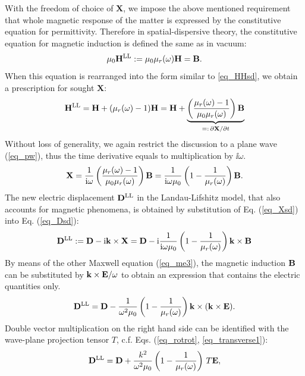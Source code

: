 With the freedom of choice of $\mathbf{X}$, we impose the above mentioned requirement that whole magnetic response of the matter is expressed by the constitutive equation for permittivity. Therefore in spatial-dispersive theory, the constitutive equation %
for magnetic induction is defined the same as in vacuum:
\begin{equation} \mu_0 {\mathbf{H}^\text{LL}} := \mu_0 \mu_r(\omega) \mathbf{H} = \mathbf{B}. \label{eq_mu_sd}\end{equation}
When this equation is rearranged into the form similar to \ref{eq_HHsd}, we obtain a prescription for sought $\mathbf{X}$: 
$$ {\mathbf{H}^\text{LL}} = \mathbf{H} + (\mu_r(\omega) -1)\mathbf{H} = \mathbf{H} + \underbrace{\left(\frac{\mu_r(\omega)-1}{\mu_0\mu_r(\omega)}\right)\mathbf{B}}_{=:\,\partial\mathbf{X}/\partial t}$$
Without loss of generality, we again restrict the discussion to a plane wave (\ref{eq_pw}), thus the time derivative equals to multiplication by $\ii\omega$.
\begin{equation} \mathbf{X} = \frac{1}{{\mathrm i}\omega}\left(\frac{\mu_r(\omega)-1}{\mu_0\mu_r(\omega)}\right)\mathbf{B} = \frac{1}{{\mathrm i}\omega\mu_0}\left(1 - \frac{1}{\mu_r(\omega)}\right)\mathbf{B}. \label{eq_Xsd}\end{equation}
The new electric displacement ${\mathbf{D}^\text{LL}}$ in the  Landau-Lifshitz model, that also accounts for magnetic phenomena, is obtained by substitution of Eq. (\ref{eq_Xsd}) into Eq. (\ref{eq_Dsd}):
\begin{equation} {\mathbf{D}^\text{LL}} := \mathbf{D} - {\mathrm i}{\mathbf{k}}\times \mathbf{X} =  \mathbf{D} - {\mathrm i}  \frac{1}{{\mathrm i}\omega\mu_0}\left(1 - \frac{1}{\mu_r(\omega)}\right) {\mathbf{k}}\times \mathbf{B}  \label{eq_Dsd2}\end{equation}
By means of the other Maxwell equation (\ref{eq_me3}), the magnetic induction $\mathbf{B}$ can be substituted by ${\mathbf{k}}\times\mathbf{E} / \omega$ to obtain an expression that contains the electric quantities only.
\begin{equation} {\mathbf{D}^\text{LL}} = \mathbf{D} - \frac{1}{\omega^2 \mu_0}\left(1 - \frac{1}{\mu_r(\omega)}\right) {\mathbf{k}}\times({\mathbf{k}}\times \mathbf{E}).  \label{eq_Dsd3}\end{equation} 
Double vector multiplication on the right hand side can be identified with the wave-plane projection tensor $T$, c.f. Eqs. (\ref{eq_rotrot}, \ref{eq_transverse1}):
\begin{equation} {\mathbf{D}^\text{LL}} = \mathbf{D} + \frac{k^2}{\omega^2 \mu_0}\left(1 - \frac{1}{\mu_r(\omega)}\right) \, T \mathbf{E},  \label{eq_Dsd4}\end{equation} 


